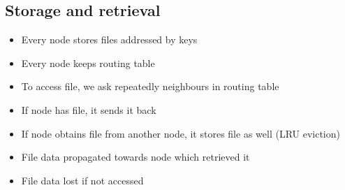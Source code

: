 \documentclass[a4paper]{scrreprt}
\begin{document}
\subsection{Storage and retrieval}

\begin{itemize}
		\item Every node stores files addressed by keys
		\item Every node keeps routing table
		\item To access file, we ask repeatedly neighbours in routing table
		\item If node has file, it sends it back
		\item If node obtains file from another node, it stores file as well (LRU eviction)
		\item File data propagated towards node which retrieved it
		\item File data lost if not accessed
\end{itemize}

\printbibliography
\end{document}
